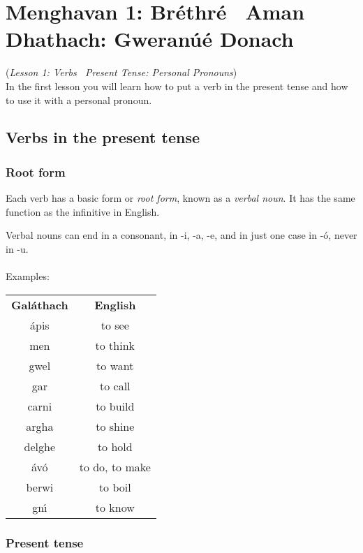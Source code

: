 \section{Menghavan 1: Br\'{e}thr\'{e} \textendash\ Aman Dhathach:  Gweran\'{u}\'{e} Donach}
(\textit{Lesson 1: Verbs  \textendash\ Present Tense: Personal Pronouns})\\

In the first lesson you will learn how to put a verb in the present tense and how to use it with a personal pronoun.

\subsection{Verbs in the present tense}

\subsubsection{Root form}

Each verb has a basic form or \textit{root form}, known as a \textit{verbal noun}. It has the same function as the infinitive in English.

Verbal nouns can end in a consonant, in -i, -a, -e, and in just one case in -\'{o}, never in -u.\\\\
Examples:
\begin{table}[H]
\centering
\begin{tabular}{cc}
  \toprule
  \textbf{Gal\'{a}thach} & \textbf{English}\\
  \cmidrule(lr){1-1}\cmidrule{2-2}
  \'{a}pis & to see\\
  men & to think\\
  gwel & to want\\
  gar & to call\\
  carni & to build\\
  argha & to shine\\
  delghe & to hold\\
  \'{a}v\'{o} & to do, to make\\
  berwi & to boil\\
  gn\'{\i} & to know\\
  \bottomrule
\end{tabular}
\label{examples_verbal_nouns}
\end{table}

\subsubsection{Present tense}


